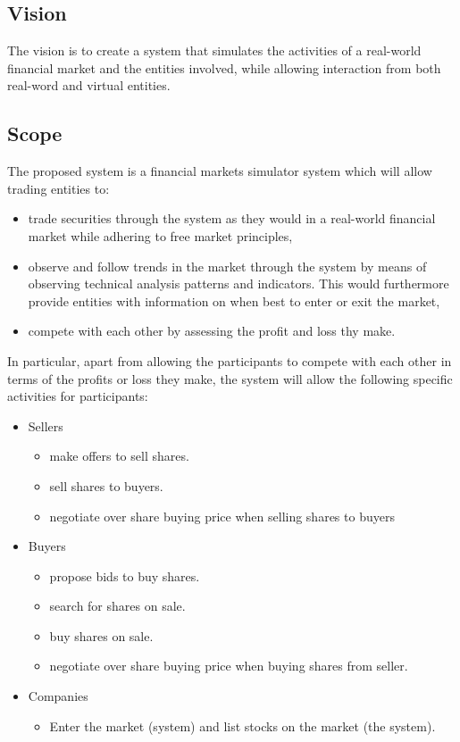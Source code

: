 \documentclass[12pt]{article}
\begin{document}
		\subsection{Vision}
		The vision is to create a system that simulates the activities of a real-world financial market and the entities involved, while allowing interaction from both real-word and virtual entities.
		
		\subsection{Scope}
		The proposed system is a financial markets simulator system which will allow trading entities to:
		\begin{itemize}
		\item trade securities through the system as they would in a real-world financial market while adhering to free market principles,
		\item observe and follow trends in the market through the system by means of observing technical analysis patterns and indicators. This would furthermore provide entities with information on when best to enter or exit the market,
		\item compete with each other by assessing the profit and loss thy make.
		\end{itemize}
		
		In particular, apart from allowing the participants to compete with each other in terms of the profits or loss they make, the system will allow the following specific activities for participants:
		
		\begin{itemize}
		\item Sellers
			\begin{itemize}
			\item make offers to sell shares.
			\item sell shares to buyers.
			\item negotiate over share buying price when selling shares to buyers
			\end{itemize}
		\item Buyers
			\begin{itemize}
			\item propose bids to buy shares.
			\item search for shares on sale.
			\item buy shares on sale.
			\item negotiate over share buying price when buying shares from seller.
			\end{itemize}
		\item Companies
			\begin{itemize}
			\item Enter the market (system) and list stocks on the market (the system).
			\end{itemize}
		
		\end{itemize}
\end{document}
